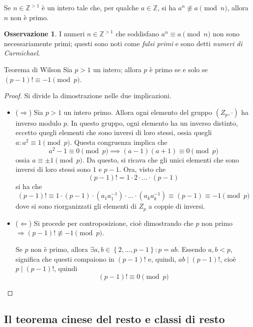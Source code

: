 \documentclass[11pt, a4paper]{scrartcl}
\theoremstyle{definition}
\numberwithin{esempio}{section}
\theoremstyle{definition}
\newtheorem{obs}{Osservazione}
\numberwithin{obs}{section}
\numberwithin{nota}{section}
\numberwithin{equation}{subsection}
\begin{document}
\begin{corollario}
	{}{}
	Se $n \in \mathbb{Z}^{>1} $ \`e un intero tale che, per qualche $a \in \mathbb{Z}$, si ha $a^n \not \equiv a \pmod{n} $, allora $n$ non \`e primo.
\end{corollario}
\begin{obs}
	I numeri $n \in \mathbb{Z}^{>1} $ che soddisfano $a^n \equiv a \pmod{n} $ non sono necessariamente primi; questi sono noti come \textit{falsi primi} e sono detti \textit{numeri di Carmichael}. 
\end{obs}
\begin{teorema}
	{Teorema di Wilson}{}
	Sia $p>1$ un intero; allora $p$ \`e primo se e solo se $(p-1)! \equiv -1 \pmod{p} $.
	\begin{proof}
		Si divide la dimostrazione nelle due implicazioni.
		\begin{itemize}
			\item ($\Rightarrow $) Sia $p > 1$ un intero primo. 
				Allora ogni elemento del gruppo $(Z_p, \cdot )$ ha inverso modulo $p$.
				In questo gruppo, ogni elemento ha un inverso distinto, eccetto quegli elementi che sono inversi di loro stessi, ossia quegli $a : a^2 \equiv 1 \pmod{p} $.
				Questa congruenza implica che
				\[
				a^2 - 1 \equiv 0 \pmod{p} \implies (a-1)(a+1) \equiv 0 \pmod{p} 
				\] 
				ossia $a \equiv \pm 1 \pmod{p} $.
				Da questo, si ricava che gli unici elementi che sono inversi di loro stessi sono $1$ e $p-1$.
				Ora, visto che 
				\[
					(p-1)! =1 \cdot 2 \cdot \ldots \cdot (p-1)
				\] 
				si ha che
				\[
					(p-1)! \equiv 1 \cdot (p-1) \cdot (a_1 a_1^{-1} ) \cdot \ldots \cdot (a_k a_k^{-1} )\equiv (p-1) \equiv -1 \pmod{p} 
				\] 
				dove si sono riorganizzati gli elementi di $Z_p$ a coppie di inversi.
			\item ($\Leftarrow$) Si procede per controposizione, cio\`e dimostrando che $p$ non primo $\Rightarrow (p-1)! \not \equiv -1 \pmod{p}$.

				Se $p$ non \`e primo, allora $\exists a,b \in \left\{ 2,\ldots,p-1 \right\} : p=ab$.
				Essendo $a,b < p$, significa che questi compaiono in $(p-1)!$ e, quindi, $ab  \mid (p-1)!$, cio\`e $p  \mid (p-1)!$, quindi
				\[
					(p-1)! \equiv 0 \pmod{p} 
				\] 
		\end{itemize}
	\end{proof}
\end{teorema}
\subsection{Il teorema cinese del resto e classi di resto}
\end{document}
